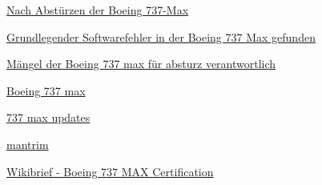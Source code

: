 \documentclass[11pt,a4paper]{article}
\begin{document}
\printbibliography

\href{https://www.deutschlandfunk.de/nach-abstuerzen-der-boeing-737-max-us-luftfahrtbehoerde-im-100.html}{Nach Abstürzen der Boeing 737-Max}

\href{https://www.nzz.ch/mobilitaet/luftfahrt/boeing-737-max-grundlegender-
softwarefehler-gefunden-ld.1499955}{Grundlegender Softwarefehler in der Boeing 737 Max gefunden}

\href{https://www.aerotelegraph.com/maengel-der-boeing-737-max-fuer-absturz-verantwortlich}{Mängel der Boeing 737 max für absturz verantwortlich}

\href{https://de.wikipedia.org/wiki/Boeing_737#Boeing_737_Max_8}{Boeing 737 max}

\href{https://www.boeing.com/737-max-updates/de/mcas/}{737 max updates}

\href{http://www.b737.org.uk/mcas.html/mantrim}{mantrim}

\href{https://deutsch.wikibrief.org/wiki/Boeing_737_MAX_certification}{Wikibrief - Boeing 737 MAX Certification}
\end{document}
